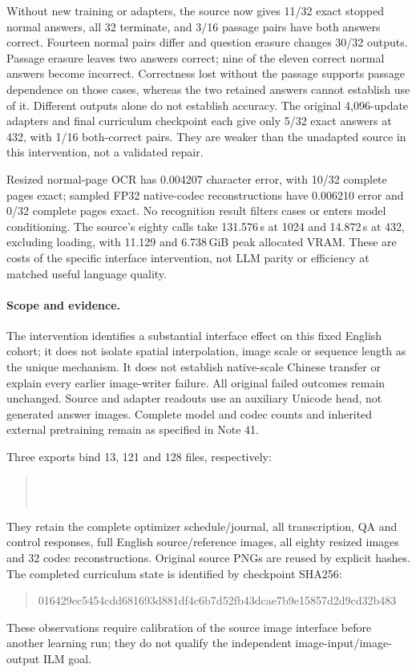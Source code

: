 \documentclass[10pt,a4paper]{article}
\begin{document}
Without new training or adapters, the source now gives 11/32 exact stopped
normal answers, all 32 terminate, and 3/16 passage pairs have both answers
correct. Fourteen normal pairs differ and question erasure changes 30/32
outputs. Passage erasure leaves two answers correct; nine of the eleven
correct normal answers become incorrect. Correctness lost without the passage
supports passage dependence on those cases, whereas the two retained answers
cannot establish use of it. Different outputs alone do not establish accuracy.
The original 4,096-update adapters and final curriculum checkpoint each give
only 5/32 exact answers at 432, with 1/16 both-correct pairs. They are weaker
than the unadapted source in this intervention, not a validated repair.

Resized normal-page OCR has 0.004207 character error, with 10/32 complete
pages exact; sampled FP32 native-codec reconstructions have 0.006210 error
and 0/32 complete pages exact. No recognition result filters cases or enters
model conditioning. The source's eighty calls take 131.576\,s at 1024 and
14.872\,s at 432, excluding loading, with 11.129 and 6.738\,GiB peak
allocated VRAM. These are costs of the specific interface intervention, not
LLM parity or efficiency at matched useful language quality.

\paragraph{Scope and evidence.}
The intervention identifies a substantial interface effect on this fixed
English cohort; it does not isolate spatial interpolation, image scale or
sequence length as the unique mechanism. It does not establish native-scale
Chinese transfer or explain every earlier image-writer failure. All original
failed outcomes remain unchanged. Source and adapter readouts use an auxiliary
Unicode head, not generated answer images. Complete model and codec counts
and inherited external pretraining remain as specified in Note 41.

Three exports bind 13, 121 and 128 files, respectively:
\begin{quote}\footnotesize
{}\\
\\
\end{quote}
They retain the complete optimizer schedule/journal,
all transcription, QA and control responses, full English source/reference
images, all eighty resized images and 32 codec reconstructions. Original
source PNGs are reused by explicit hashes. The completed curriculum state is
identified by checkpoint SHA256:
\begin{quote}\footnotesize\ttfamily
016429ec5454cdd681693d881df4c6b7d52fb43dcae7b9e15857d2d9cd32b483
\end{quote}
These observations require calibration
of the source image interface before another learning run; they do not
qualify the independent image-input/image-output ILM goal.
\end{document}
